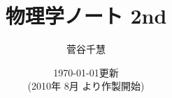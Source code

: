 ﻿%
    \title{
        \Huge{物理学ノート 2nd}
    }

    \author{
        菅谷\;\;\;千慧
    }

    \date{
        \today \quad 更新\\
        {\small (2010年 8月 より作製開始)}
    }
    \par
